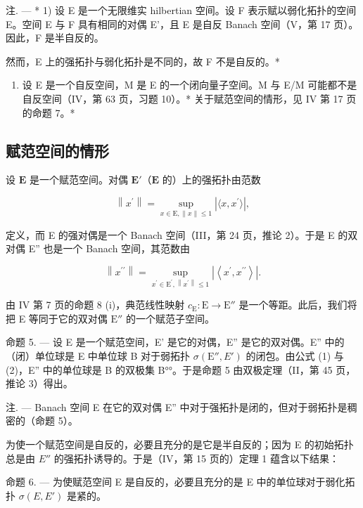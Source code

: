 注. --- * 1) 设 E 是一个无限维实 hilbertian 空间。设 F 表示赋以弱化拓扑的空间 E。空间 E 与 F 具有相同的对偶 E'，且 E 是自反 Banach 空间（V，第 17 页）。因此，F 是半自反的。

然而，E 上的强拓扑与弱化拓扑是不同的，故 F 不是自反的。*

\begin{enumerate}
\def\labelenumi{\arabic{enumi})}
\setcounter{enumi}{1}
\tightlist
\item
  设 E 是一个自反空间，M 是 E 的一个闭向量子空间。M 与 E/M 可能都不是自反空间（IV，第 63 页，习题 10）。* 关于赋范空间的情形，见 IV 第 17 页的命题 7。*
\end{enumerate}

\subsection{赋范空间的情形}

设 \(\mathbf{E}\) 是一个赋范空间。对偶 \(\mathbf{E}'\)（\(\mathbf{E}\) 的）上的强拓扑由范数

\[
\left\| x ^ {\prime} \right\| = \sup _ {x \in \mathrm{E}, \| x \| \leqslant 1} \left| \langle x, x ^ {\prime} \rangle \right|,\tag{1}
\]

定义，而 E 的强对偶是一个 Banach 空间（III，第 24 页，推论 2）。于是 E 的双对偶 E'' 也是一个 Banach 空间，其范数由

\[
\left\| x ^ {\prime \prime} \right\| = \sup _ {x ^ {\prime} \in \mathrm{E} ^ {\prime}, \left\| x ^ {\prime} \right\| \leqslant 1} \left| \left\langle x ^ {\prime}, x ^ {\prime \prime} \right\rangle \right|.\tag{2}
\]

由 IV 第 7 页的命题 8 (i)，典范线性映射 \(c_{\mathrm{E}}: \mathrm{E} \to \mathrm{E}''\) 是一个等距。此后，我们将把 E 等同于它的双对偶 \(\mathrm{E}''\) 的一个赋范子空间。

命题 5. --- 设 E 是一个赋范空间，E' 是它的对偶，E'' 是它的双对偶。E'' 中的（闭）单位球是 E 中单位球 B 对于弱拓扑 \(\sigma(\mathrm{E}'', E')\) 的闭包。由公式 (1) 与 (2)，E'' 中的单位球是 B 的双极集 B°°。于是命题 5 由双极定理（II，第 45 页，推论 3）得出。

注. --- Banach 空间 E 在它的双对偶 E'' 中对于强拓扑是闭的，但对于弱拓扑是稠密的（命题 5）。

为使一个赋范空间是自反的，必要且充分的是它是半自反的；因为 E 的初始拓扑总是由 \(E''\) 的强拓扑诱导的。于是（IV，第 15 页的）定理 1 蕴含以下结果：

命题 6. --- 为使赋范空间 E 是自反的，必要且充分的是 E 中的单位球对于弱化拓扑 \(\sigma(E, E')\) 是紧的。

